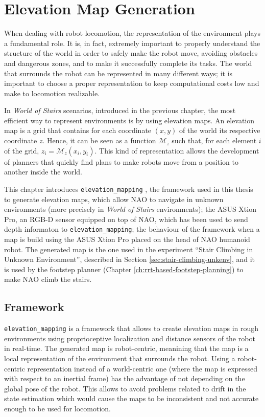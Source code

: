 \chapter{Elevation Map Generation}
\label{ch:elevation-map-generation}
When dealing with robot locomotion, the representation of the environment plays 
a fundamental role. It is, in fact, extremely important to properly
understand the structure of the world in order to safely make the robot move,
avoiding obstacles and dangerous zones, and to make it successfully complete 
its tasks. The world that surrounds the robot can be represented in many 
different ways; it is important to choose a proper representation to keep 
computational costs low and make to locomotion realizable.

In \textit{World of Stairs} scenarios, introduced in the previous chapter, the 
most efficient way to represent environments is by using elevation maps.
An elevation map is a grid that contains for each coordinate $(x, y)$ of the 
world its respective coordinate $z$. Hence, it can be seen as a function 
$\mathcal{M}_z$ such that, for each element $i$ of the grid,
$z_i = \mathcal{M}_z(x_i, y_i)$. This kind of representation allows the 
development of planners that quickly find plans to make robots move from a
position to another inside the world. 

This chapter introduces \texttt{elevation\_mapping}
\cite{Fankhauser2018ProbabilisticTerrainMapping}, the framework used in this 
thesis to generate elevation maps, which allow NAO to navigate in unknown 
environments (more precisely in \textit{World of Stairs} environments);
the ASUS Xtion Pro, an RGB-D sensor equipped on top of NAO, which has been 
used to send depth informaton to \texttt{elevation\_mapping}; 
the behaviour of the framework when a map is build using the ASUS Xtion Pro
placed on the head 
of NAO humanoid robot. The generated map is the one used in the experiment 
``Stair Climbing in Unknown Environment'', described in Section
\ref{sec:stair-climbing-unkenv}, and it is used by the footstep planner (Chapter
\ref{ch:rrt-based-footstep-planning}) to make NAO climb the stairs.

\section{Framework}
\texttt{elevation\_mapping} \cite{Fankhauser2018ProbabilisticTerrainMapping}
is a framework that allows to create elevation maps 
in rough environments using proprioceptive localization and distance sensors 
of the robot in real-time. The generated map is robot-centric,
meanining that the map is a local representation of the environment that 
surrounds the robot. Using a robot-centric representation instead of a 
world-centric one (where the map is expressed with respect to an inertial 
frame) has the advantage of not depending on the global pose of the robot.
This allows to avoid problems related to drift in the state estimation 
which would cause the maps 
to be inconsistent and not accurate enough to be used for locomotion.

